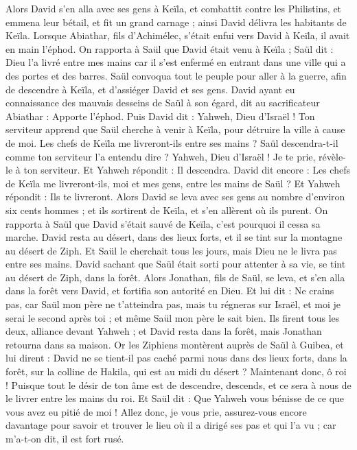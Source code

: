 \begin{multicols}{2}
Alors David s'en alla avec ses gens à Keïla, et combattit contre les Philistins, et emmena leur bétail, et fit un grand carnage ; ainsi David délivra les habitants de Keïla.
Lorsque Abiathar, fils d'Achimélec, s'était enfui vers David à Keïla, il avait en main l'éphod.
On rapporta à Saül que David était venu à Keïla ; Saül dit : Dieu l'a livré entre mes mains car il s'est enfermé en entrant dans une ville qui a des portes et des barres.
Saül convoqua tout le peuple pour aller à la guerre, afin de descendre à Keïla, et d'assiéger David et ses gens.
David ayant eu connaissance des mauvais desseins de Saül à son égard, dit au sacrificateur Abiathar : Apporte l'éphod.
Puis David dit : Yahweh, Dieu d'Israël ! Ton serviteur apprend que Saül cherche à venir à Keïla, pour détruire la ville à cause de moi.
Les chefs de Keïla me livreront-ils entre ses mains ? Saül descendra-t-il comme ton serviteur l'a entendu dire ? Yahweh, Dieu d'Israël ! Je te prie, révèle-le à ton serviteur. Et Yahweh répondit : Il descendra.
David dit encore : Les chefs de Keïla me livreront-ils, moi et mes gens, entre les mains de Saül ? Et Yahweh répondit : Ils te livreront.
Alors David se leva avec ses gens au nombre d’environ six cents hommes ; et ils sortirent de Keïla, et s'en allèrent où ils purent. On rapporta à Saül que David s'était sauvé de Keïla, c'est pourquoi il cessa sa marche.
David resta au désert, dans des lieux forts, et il se tint sur la montagne au désert de Ziph. Et Saül le cherchait tous les jours, mais Dieu ne le livra pas entre ses mains.
David sachant que Saül était sorti pour attenter à sa vie, se tint au désert de Ziph, dans la forêt.
Alors Jonathan, fils de Saül, se leva, et s'en alla dans la forêt vers David, et fortifia son autorité en Dieu.
Et lui dit : Ne crains pas, car Saül mon père ne t’atteindra pas, mais tu régneras sur Israël, et moi je serai le second après toi ; et même Saül mon père le sait bien.
Ils firent tous les deux, alliance devant Yahweh ; et David resta dans la forêt, mais Jonathan retourna dans sa maison.
Or les Ziphiens montèrent auprès de Saül à Guibea, et lui dirent : David ne se tient-il pas caché parmi nous dans des lieux forts, dans la forêt, sur la colline de Hakila, qui est au midi du désert ?
Maintenant donc, ô roi ! Puisque tout le désir de ton âme est de descendre, descends, et ce sera à nous de le livrer entre les mains du roi.
Et Saül dit : Que Yahweh vous bénisse de ce que vous avez eu pitié de moi !
Allez donc, je vous prie, assurez-vous encore davantage pour savoir et trouver le lieu où il a dirigé ses pas et qui l’a vu ; car m’a-t-on dit, il est fort rusé.

\end{multicols}
